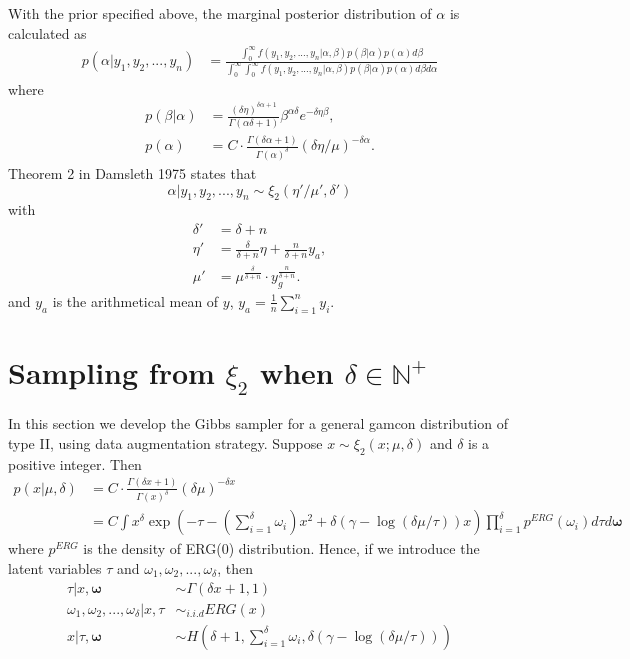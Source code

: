 \documentclass[11pt, oneside]{article}
\begin{document}
With the prior specified above, the marginal posterior distribution of $\alpha$ is calculated as 
\begin{align}
p(\alpha | y_1, y_2, ..., y_n) &= \frac{\int_0^\infty f(y_1, y_2, ..., y_n | \alpha, \beta)p(\beta|\alpha)p(\alpha) d\beta }{\int_0^\infty\int_0^\infty f(y_1, y_2, ..., y_n | \alpha, \beta)p(\beta|\alpha)p(\alpha) d\beta d\alpha}
\end{align} 
where
\begin{align}
p(\beta|\alpha) &= \frac{(\delta\eta)^{\delta\alpha + 1}}{\Gamma(\alpha\delta + 1)}\beta^{\alpha\delta} e^{-\delta\eta\beta},\\
p(\alpha) &= C\cdot \frac{\Gamma(\delta\alpha + 1)}{\Gamma(\alpha)^\delta} (\delta\eta/\mu)^{-\delta\alpha}.
\end{align}
Theorem 2 in Damsleth 1975 states that 
\begin{equation}
\alpha | y_1, y_2, ..., y_n \sim \xi_2(\eta'/\mu', \delta')
\end{equation} 
with
\begin{align*}
\delta' &= \delta + n\\
\eta' &= \frac{\delta}{\delta + n}\eta + \frac{n}{\delta + n} y_a, \\
\mu' &= \mu^{\frac{\delta}{\delta + n}}\cdot y_g^{\frac{n}{\delta + n}}.
\end{align*}
and $y_a$ is the arithmetical mean of $y$, $y_a = \frac{1}{n}\sum_{i=1}^{n} y_i$.

\section{Sampling from $\xi_2$ when $\delta \in \mathbb{N}^+$}
In this section we develop the Gibbs sampler for a general gamcon distribution of type II, using data augmentation strategy. Suppose $x \sim \xi_2(x; \mu, \delta)$ and $\delta$ is a positive integer. Then
\begin{align}
p(x|\mu, \delta) &= C\cdot \frac{\Gamma(\delta x + 1)}{\Gamma(x)^\delta} (\delta\mu)^{-\delta x} \\
&= C \int x^\delta \exp\left(-\tau-\left(\sum_{i=1}^{\delta} \omega_i\right) x^2 + \delta(\gamma-\log(\delta\mu/\tau)) x\right) \prod_{i=1}^\delta p^{ERG}(\omega_i) d\tau d\bm{\omega}
\end{align}
where $p^{ERG}$ is the density of ERG(0) distribution. Hence, if we introduce the latent variables $\tau$ and $\omega_1, \omega_2, ..., \omega_{\delta}$, then  
\begin{align}
\tau | x, \bm{\omega} &\sim \Gamma(\delta x +1, 1) \\
\omega_1, \omega_2, ..., \omega_\delta | x, \tau &\sim_{i.i.d} ERG(x)\\
x | \tau, \bm{\omega} &\sim H\left(\delta+1, \sum_{i=1}^\delta \omega_i, \delta\left(\gamma - \log(\delta\mu/\tau)\right)\right)
\end{align}
\end{document}
